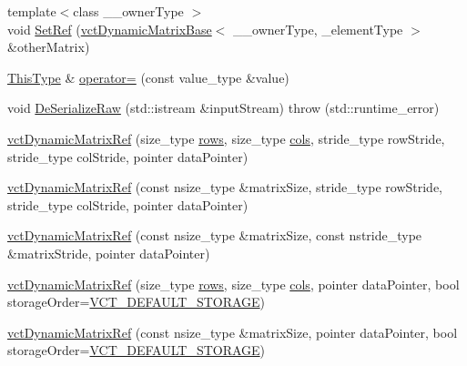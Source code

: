 \begin{DoxyCompactItemize}
\item 
{\footnotesize template$<$class \+\_\+\+\_\+owner\+Type $>$ }\\void \hyperlink{classvct_dynamic_matrix_ref_aaaaf1de3aadb8ee364a8f17f92c335b3}{Set\+Ref} (\hyperlink{classvct_dynamic_matrix_base}{vct\+Dynamic\+Matrix\+Base}$<$ \+\_\+\+\_\+owner\+Type, \+\_\+element\+Type $>$ \&other\+Matrix)
\item 
\hyperlink{classvct_dynamic_matrix_ref_ac01200e3df0afe95f5d3948da84c8551}{This\+Type} \& \hyperlink{classvct_dynamic_matrix_ref_a9fd7137b6e41a81168182823db65d5e4}{operator=} (const value\+\_\+type \&value)
\item 
void \hyperlink{classvct_dynamic_matrix_ref_af6c3423067d86655579363f3f44e2a96}{De\+Serialize\+Raw} (std\+::istream \&input\+Stream)  throw (std\+::runtime\+\_\+error)
\end{DoxyCompactItemize}
{\bf }\par
\begin{DoxyCompactItemize}
\item 
\hyperlink{classvct_dynamic_matrix_ref_a4e4ff98825a32444a82ccf10dd62686d}{vct\+Dynamic\+Matrix\+Ref} (size\+\_\+type \hyperlink{classvct_dynamic_const_matrix_base_a5eac13be2207ebeb8766cde379d73438}{rows}, size\+\_\+type \hyperlink{classvct_dynamic_const_matrix_base_aa6c51d41a100da49a7e7ac7edb20ecd9}{cols}, stride\+\_\+type row\+Stride, stride\+\_\+type col\+Stride, pointer data\+Pointer)
\item 
\hyperlink{classvct_dynamic_matrix_ref_a933bf3b1a9c32f3b83db85525066f813}{vct\+Dynamic\+Matrix\+Ref} (const nsize\+\_\+type \&matrix\+Size, stride\+\_\+type row\+Stride, stride\+\_\+type col\+Stride, pointer data\+Pointer)
\item 
\hyperlink{classvct_dynamic_matrix_ref_aed17c60197e8aac0b3dc62695ddeebce}{vct\+Dynamic\+Matrix\+Ref} (const nsize\+\_\+type \&matrix\+Size, const nstride\+\_\+type \&matrix\+Stride, pointer data\+Pointer)
\end{DoxyCompactItemize}

{\bf }\par
\begin{DoxyCompactItemize}
\item 
\hyperlink{classvct_dynamic_matrix_ref_a04a1d47d19b1f87cd6a1558698ecab2d}{vct\+Dynamic\+Matrix\+Ref} (size\+\_\+type \hyperlink{classvct_dynamic_const_matrix_base_a5eac13be2207ebeb8766cde379d73438}{rows}, size\+\_\+type \hyperlink{classvct_dynamic_const_matrix_base_aa6c51d41a100da49a7e7ac7edb20ecd9}{cols}, pointer data\+Pointer, bool storage\+Order=\hyperlink{vct_forward_declarations_8h_aacdb3b0140beef8a3c2025b808b74a73}{V\+C\+T\+\_\+\+D\+E\+F\+A\+U\+L\+T\+\_\+\+S\+T\+O\+R\+A\+G\+E})
\item 
\hyperlink{classvct_dynamic_matrix_ref_ae2b84ddbbcb23365616c01773c858946}{vct\+Dynamic\+Matrix\+Ref} (const nsize\+\_\+type \&matrix\+Size, pointer data\+Pointer, bool storage\+Order=\hyperlink{vct_forward_declarations_8h_aacdb3b0140beef8a3c2025b808b74a73}{V\+C\+T\+\_\+\+D\+E\+F\+A\+U\+L\+T\+\_\+\+S\+T\+O\+R\+A\+G\+E})
\end{DoxyCompactItemize}

